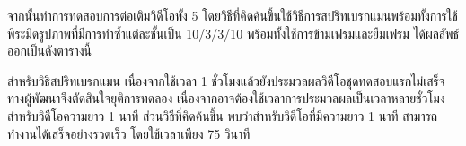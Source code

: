 

		
\hspace{1cm}  จากนั้นทำการทดสอบการต่อเติมวิดีโอทั้ง 5 โดยวิธีที่คิดค้นขึ้นใช้วิธีการสปริทเบรกแมนพร้อมทั้งการใช้พีระมิดรูปภาพที่มีการทำซ้ำแต่ละชั้นเป็น 10/3/3/10  พร้อมทั้งใช้การข้ามเฟรมและยืมเฟรม ได้ผลลัพธ์ออกเป็นดังตารางนี้



\hspace{1cm} สำหรับวิธีสปริทเบรกแมน เนื่องจากใช้เวลา 1 ชั่วโมงแล้วยังประมวลผลวิดีโอชุดทดสอบแรกไม่เสร็จ ทางผู้พัฒนาจึงตัดสินใจยุติการทดลอง เนื่องจากอาจต้องใช้เวลาการประมวลผลเป็นเวลาหลายชั่วโมงสำหรับวิดีโอความยาว 1 นาที ส่วนวิธีที่คิดค้นขึ้น พบว่าสำหรับวิดีโอที่มีความยาว 1 นาที สามารถทำงานได้เสร็จอย่างรวดเร็ว โดยใช้เวลาเพียง 75 วินาที